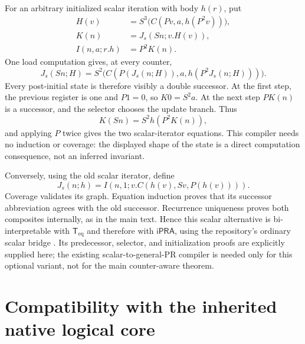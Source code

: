 \documentclass[11pt,letterpaper]{article}
\theoremstyle{definition}\newtheorem{definition}[theorem]{Definition}
\theoremstyle{remark}\newtheorem{remark}[theorem]{Remark}
\newcommand{\ipra}{\mathsf{iPRA}}
\newcommand{\TI}{\mathsf T_{\mathrm{eq}}}
\begin{document}
For an arbitrary initialized scalar iteration with body $h(r)$, put
\begin{align*}
 H(v)&=S^3\bigl(C(Pv,a,h(P^2v))\bigr),\\
 K(n)&=J_s(Sn;v.H(v)),\\
 I(n,a;r.h)&=P^2K(n).
\end{align*}
One load computation gives, at every counter,
\[
 J_s(Sn;H)=S^2\bigl(C(P(J_s(n;H)),a,h(P^2J_s(n;H)))\bigr).
\]
Every post-initial state is therefore visibly a double successor.
At the first step, the previous register is one and $P1=0$, so
$K0=S^2a$. At the next step $PK(n)$ is a successor, and the selector
chooses the update branch. Thus
\[
 K(Sn)=S^2h(P^2K(n)),
\]
and applying $P$ twice gives the two scalar-iterator equations.
This compiler needs no induction or coverage: the displayed shape
of the state is a direct computation consequence, not an inferred
invariant.

Conversely, using the old scalar iterator, define
\[
 J_s(n;h)=I(n,1;v.C(h(v),Sv,P(h(v)))).
\]
Coverage validates its graph. Equation induction proves that its
successor abbreviation agrees with the old successor. Recurrence
uniqueness proves both composites internally, as in the main text.
Hence this scalar alternative is bi-interpretable with $\TI$ and
therefore with $\ipra$, using the repository's ordinary scalar bridge
\cite{bridge}. Its predecessor, selector, and initialization proofs
are explicitly supplied here; the existing scalar-to-general-PR
compiler is needed only for this optional variant, not for the main
counter-aware theorem.

\section{Compatibility with the inherited native logical core}
\end{document}
